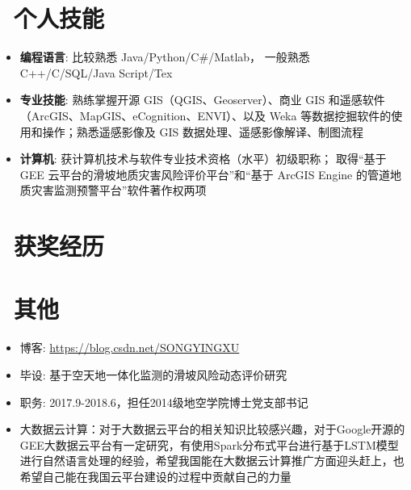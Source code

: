 \documentclass{resume}
\begin{document}
\section{\faCogs\ 个人技能}
\begin{itemize}[parsep=0.25ex]
  \item \textbf{编程语言}:
    比较熟悉 Java/Python/C\#/Matlab，
    一般熟悉 C++/C/SQL/Java Script/Tex
  
  \item \textbf{专业技能}:
  熟练掌握开源 GIS（QGIS、Geoserver）、商业 GIS 和遥感软件（ArcGIS、MapGIS、eCognition、ENVI）、以及 Weka 等数据挖掘软件的使用和操作；熟悉遥感影像及 GIS 数据处理、遥感影像解译、制图流程

  \item \textbf{计算机}:
  获计算机技术与软件专业技术资格（水平）初级职称；
  取得“基于 GEE 云平台的滑坡地质灾害风险评价平台”和“基于 ArcGIS Engine 的管道地质灾害监测预警平台”软件著作权两项

\end{itemize}

\section{\faHeartO\ 获奖经历}

\section{\faInfo\ 其他}
\begin{itemize}[parsep=0.25ex]
  \item 博客: \url{https://blog.csdn.net/SONGYINGXU} 
  \item 毕设: 基于空天地一体化监测的滑坡风险动态评价研究
  \item 职务: 2017.9-2018.6，担任2014级地空学院博士党支部书记
  \item 大数据云计算：对于大数据云平台的相关知识比较感兴趣，对于Google开源的GEE大数据云平台有一定研究，有使用Spark分布式平台进行基于LSTM模型进行自然语言处理的经验，希望我国能在大数据云计算推广方面迎头赶上，也希望自己能在我国云平台建设的过程中贡献自己的力量
\end{itemize}

%
%
\end{document}
